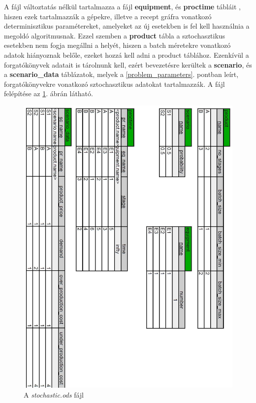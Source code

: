 A  fájl változtatás nélkül tartalmazza a  fájl \textbf{equipment}, és \textbf{proctime} tábláit , hiszen ezek tartalmazzák a gépekre, illetve a recept gráfra vonatkozó determinisztikus paramétereket, amelyeket az új esetekben is fel kell használnia a megoldó algoritmusnak.
Ezzel szemben a \textbf{product} tábla a sztochasztikus esetekben nem fogja megállni a helyét, hiszen a batch méretekre vonatkozó adatok hiányoznak belőle, ezeket hozzá kell adni a product táblához.
Ezenkívül a forgatókönyvek adatait is tárolnunk kell, ezért bevezetésre kerültek a\textbf{ scenario}, és a \textbf{scenario\_data} táblázatok, melyek a \ref{problem_parameters}. pontban leírt, forgatókönyvekre vonatkozó sztochasztikus adatokat tartalmazzák.
A  fájl felépítése az \ref{stochastic_odshere}. ábrán látható.
\begin{figure}[H]
\begin{center}
\includegraphics[scale=0.58]{stochasticOds}
\caption{A \textit{stochastic.ods} fájl}
\label{stochastic_odshere}
\end{center}
\end{figure}
